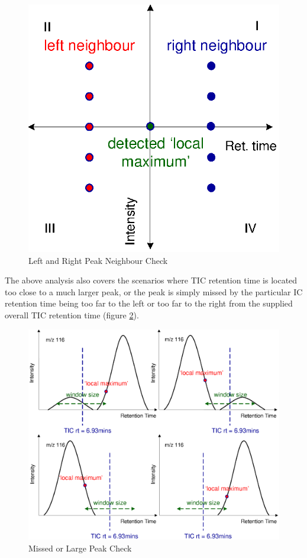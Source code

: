 \begin{figure}
  \begin{center}
    \includegraphics[scale=0.7]{graphics/chapter08/84.eps}
  \end{center}
  \caption{Left and Right Peak Neighbour Check}
  \label{fig:84}
\end{figure}

The above analysis also covers the scenarios where TIC retention time is located 
too close to a much larger peak, or the peak is simply missed by the particular 
IC retention time being too far to the left or too far to the right from the 
supplied overall TIC retention time (figure \ref{fig:85}).

\begin{figure}
  \begin{center}
    \includegraphics[scale=0.7]{graphics/chapter08/85.eps}
  \end{center}
  \caption{Missed or Large Peak Check}
  \label{fig:85}
\end{figure}

